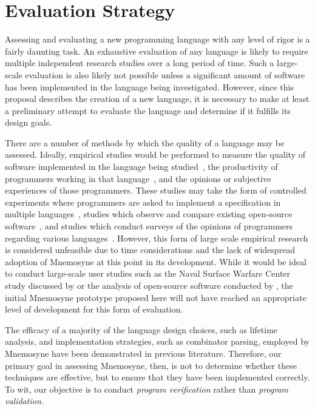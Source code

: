 \documentclass[11pt,a4paper]{article}
\theoremstyle{break}
\begin{document}
\vspace*{-.2in}
\section{Evaluation Strategy}
\label{sec:evaluate}
\vspace*{-.1in}

Assessing and evaluating a new programming language with any level of rigor is a fairly daunting task. An exhaustive evaluation of any language is likely to require multiple independent research studies over a long period of time. Such a large-scale evaluation is also likely not possible unless a significant amount of software has been implemented in the language being investigated. However, since this proposal describes the creation of a new language, it is necessary to make at least a preliminary attempt to evaluate the language and determine if it fulfills its design goals.

There are a number of methods by which the quality of a language may be assessed. Ideally, empirical studies would be performed to measure the quality of software implemented in the language being studied~\cite{Bhattacharya:2011:APL:1985793.1985817,Ray:2014:LSS:2635868.2635922}, the productivity of programmers working in that language~\cite{hudak1994haskell}, and the opinions or subjective experiences of those programmers. These studies may take the form of controlled experiments where programmers are asked to implement a specification in multiple languages~\cite{hudak1994haskell,Ray:2014:LSS:2635868.2635922}, studies which observe and compare existing open-source software~\cite{Ray:2014:LSS:2635868.2635922,Bhattacharya:2011:APL:1985793.1985817}, and studies which conduct surveys of the opinions of programmers regarding various languages~\cite{Ray:2014:LSS:2635868.2635922}. However, this form of large scale empirical research is considered unfeasible due to time considerations and the lack of widespread adoption of Mnemosyne at this point in its development. While it would be ideal to conduct large-scale user studies such as the Naval Surface Warfare Center study discussed by \citeauthor{hudak1994haskell} or the analysis of open-source software conducted by \citeauthor{Ray:2014:LSS:2635868.2635922}, the initial Mnemosyne prototype proposed here will not have reached an appropriate level of development for this form of evaluation.

The efficacy of a majority of the language design choices, such as lifetime analysis, and implementation strategies, such as combinator parsing, employed by Mnemosyne have been demonstrated in previous literature. Therefore, our primary goal in assessing Mnemosyne, then, is not to determine whether these techniques are effective, but to ensure that they have been implemented correctly. To wit, our objective is to conduct \textit{program verification} rather than \textit{program validation}.
\end{document}
